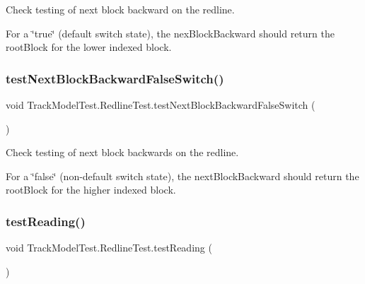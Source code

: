 Check testing of next block backward on the redline. 

For a \char`\"{}true\char`\"{} (default switch state), the nex\+Block\+Backward should return the root\+Block for the lower indexed block. \mbox{\label{classTrackModelTest_1_1RedlineTest_a2970dbaa3e66e82f5e1c6881dae59112}} 
\subsubsection{\texorpdfstring{test\+Next\+Block\+Backward\+False\+Switch()}{testNextBlockBackwardFalseSwitch()}}
{\footnotesize\ttfamily void Track\+Model\+Test.\+Redline\+Test.\+test\+Next\+Block\+Backward\+False\+Switch (\begin{DoxyParamCaption}{ }\end{DoxyParamCaption})\hspace{0.3cm}{\ttfamily [package]}}



Check testing of next block backwards on the redline. 

For a \char`\"{}false\char`\"{} (non-\/default switch state), the next\+Block\+Backward should return the root\+Block for the higher indexed block. \mbox{\label{classTrackModelTest_1_1RedlineTest_ae4dcd25f8b5aa3ad7b8dc6ba5653fdab}} 
\subsubsection{\texorpdfstring{test\+Reading()}{testReading()}}
{\footnotesize\ttfamily void Track\+Model\+Test.\+Redline\+Test.\+test\+Reading (\begin{DoxyParamCaption}{ }\end{DoxyParamCaption})\hspace{0.3cm}{\ttfamily [package]}}



